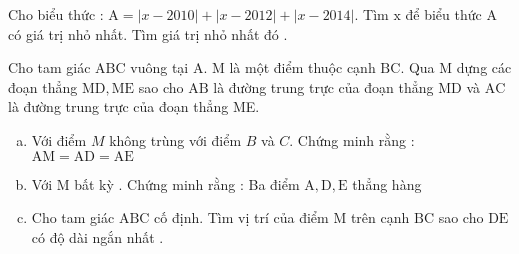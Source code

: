 \begin{bt}
	Cho biểu thức : $\mathrm{A}=|x-2010|+|x-2012|+|x-2014|$.
	Tìm $\mathrm{x}$ để biểu thức $\mathrm{A}$ có giá trị nhỏ nhất. Tìm giá trị nhỏ nhất đó .
	\loigiai{}
\end{bt}

\begin{bt}
	Cho tam giác $\mathrm{ABC}$ vuông tại $\mathrm{A}$. M là một điểm thuộc cạnh $\mathrm{BC}$. Qua $\mathrm{M}$ dựng các đoạn thẳng $\mathrm{MD}, \mathrm{ME}$ sao cho $\mathrm{AB}$ là đường trung trực của đoạn thẳng $\mathrm{MD}$ và $\mathrm{AC}$ là đường trung trực của đoạn thẳng ME.
	\begin{enumerate}[a.]
		\item Với điểm $M$ không trùng với điểm $B$ và $C$.
		Chứng minh rằng : $\mathrm{AM}=\mathrm{AD}=\mathrm{AE}$
		\item Với $\mathrm{M}$ bất kỳ . Chứng minh rằng : Ba điểm $\mathrm{A}, \mathrm{D}, \mathrm{E}$ thẳng hàng
		\item Cho tam giác $\mathrm{ABC}$ cố định. Tìm vị trí của điểm $\mathrm{M}$ trên cạnh $\mathrm{BC}$ sao cho $\mathrm{DE}$ có độ dài ngắn nhất .
	\end{enumerate}
	\loigiai{} 
\end{bt}


